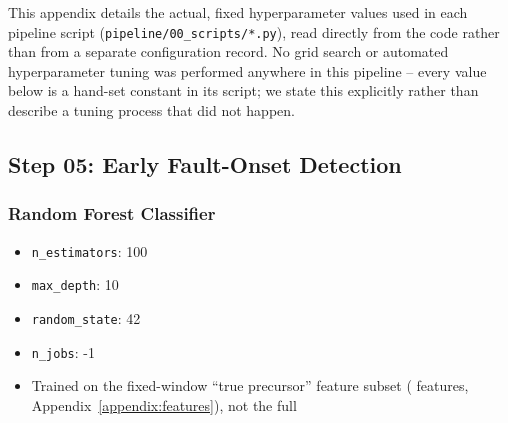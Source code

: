 
\label{appendix:hyperparameters}

This appendix details the actual, fixed hyperparameter values used in each pipeline script (\texttt{pipeline/00\_scripts/*.py}), read directly from the code rather than from a separate configuration record. No grid search or automated hyperparameter tuning was performed anywhere in this pipeline -- every value below is a hand-set constant in its script; we state this explicitly rather than describe a tuning process that did not happen.  %

\subsection{Step 05: Early Fault-Onset Detection}  %

\subsubsection{Random Forest Classifier}
\begin{itemize}
    \item \texttt{n\_estimators}: 100  %
    \item \texttt{max\_depth}: 10  %
    \item \texttt{random\_state}: 42  %
    \item \texttt{n\_jobs}: -1  %
    \item Trained on the fixed-window ``true precursor'' feature subset (\MetricZeroFivePhaseZeroPrecursorNFeatures{} features, Appendix~\ref{appendix:features}), not the full \MetricZeroSixBinaryClassificationNFeatures{}
\end{itemize}

